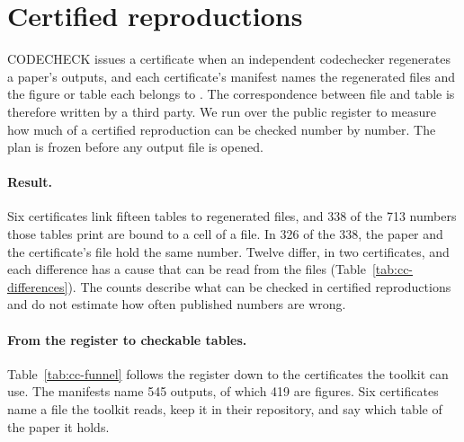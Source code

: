 
\section{Certified reproductions}
\label{sec:codecheck}

CODECHECK issues a certificate when an independent codechecker regenerates a paper's outputs, and
each certificate's manifest names the regenerated files and the figure or table each belongs to
\citep{nust2021codecheck}. The correspondence between file and table
is therefore written by a third party. We run \reproverify{} over the public register to measure
how much of a certified reproduction can be checked number by number. The plan is frozen
before any output file is opened.

\paragraph{Result.} Six certificates link fifteen tables to regenerated files, and 338 of the
713 numbers those tables print are bound to a cell of a file. In 326 of the 338, the paper and the
certificate's file hold the same number. Twelve differ, in two certificates, and each difference
has a cause that can be read from the files (Table~\ref{tab:cc-differences}). The counts describe
what can be checked in certified reproductions and do not estimate how often published numbers
are wrong.

\paragraph{From the register to checkable tables.} Table~\ref{tab:cc-funnel} follows the
register down to the certificates the toolkit can use. The manifests name 545 outputs, of which
419 are figures. Six certificates name a file the toolkit reads, keep it in their repository,
and say which table of the paper it holds.

